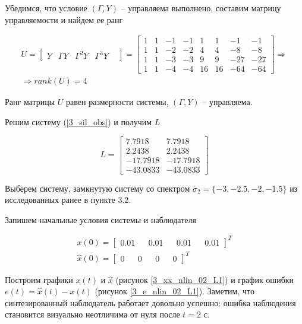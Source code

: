 Убедимся, что условие $(\Gamma,Y)$ -- управляема выполнено, составим матрицу управляемости и найдем ее ранг

\begin{multline}
    U = \begin{bmatrix}
    Y & \Gamma Y & \Gamma^2 Y &\Gamma^3 Y &
    \end{bmatrix} = \begin{bmatrix}
        1	&1&	-1&	-1&	1	&1&	-1&	-1\\
1	&1	&-2	&-2&	4&	4	&-8&	-8\\
1	&1	&-3&	-3&	9	&9	&-27&	-27\\
1	&1	&-4&	-4&	16&	16&	-64&	-64
    \end{bmatrix} \Rightarrow\\
    \Rightarrow rank(U) = 4
\end{multline}

Ранг матрицы $U$ равен размерности системы, $(\Gamma,Y)$ -- управляема.

Решим систему (\ref{3_sil_obs}) и получим $L$

\begin{equation}
    L = \begin{bmatrix}
        7.7918	&7.7918\\
2.2438	&2.2438\\
-17.7918	&-17.7918\\
-43.0833	&-43.0833
    \end{bmatrix}
\end{equation}

Выберем систему, замкнутую систему со спектром $\sigma_2 = \{ -3, -2.5, -2, -1.5 \}$ из исследованных ранее в пункте 3.2.


Запишем начальные условия системы и наблюдателя

\begin{equation}
    \begin{matrix}
        x(0) = \begin{bmatrix}
    0.01&&
    0.01&&
    0.01&&
    0.01
\end{bmatrix}^T\\
 \hat{x}(0) = \begin{bmatrix}
    0&&
    0&&
    0&&
    0
\end{bmatrix}^T
    \end{matrix}
\end{equation}

Построим графики $x(t)$ и $\hat{x}$ (рисунок \ref{3_xx_nlin_02_L1}) и график ошибки $e(t) = \hat{x}(t) - x(t)$ (рисунок \ref{3_e_nlin_02_L1}). Заметим, что синтезированный наблюдатель работает довольно успешно: ошибка наблюдения становится визуально неотличима от нуля после $t=2$ с.

